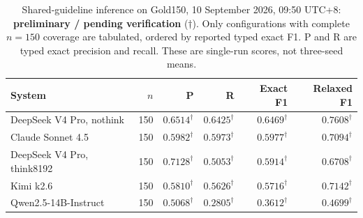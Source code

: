 \begin{table}[htbp]
\centering
\small
\caption{Shared-guideline inference on Gold150, 10 September 2026, 09:50 UTC+8: \textbf{preliminary / pending verification} ($\dagger$). Only configurations with complete $n=150$ coverage are tabulated, ordered by reported typed exact F1. P and R are typed exact precision and recall. These are single-run scores, not three-seed means.}
\label{tab:gold150-shared-r7}
\begin{tabular*}{\linewidth}{@{\extracolsep{\fill}}lrrrrr@{}}
\toprule
System & $n$ & P & R & Exact F1 & Relaxed F1 \\
\midrule
DeepSeek V4 Pro, nothink & 150 & $0.6514^{\dagger}$ & $0.6425^{\dagger}$ & $0.6469^{\dagger}$ & $0.7608^{\dagger}$ \\
Claude Sonnet 4.5 & 150 & $0.5982^{\dagger}$ & $0.5973^{\dagger}$ & $0.5977^{\dagger}$ & $0.7094^{\dagger}$ \\
DeepSeek V4 Pro, think8192 & 150 & $0.7128^{\dagger}$ & $0.5053^{\dagger}$ & $0.5914^{\dagger}$ & $0.6708^{\dagger}$ \\
Kimi k2.6 & 150 & $0.5810^{\dagger}$ & $0.5626^{\dagger}$ & $0.5716^{\dagger}$ & $0.7142^{\dagger}$ \\
Qwen2.5-14B-Instruct & 150 & $0.5068^{\dagger}$ & $0.2805^{\dagger}$ & $0.3612^{\dagger}$ & $0.4699^{\dagger}$ \\
\bottomrule
\end{tabular*}
\end{table}
